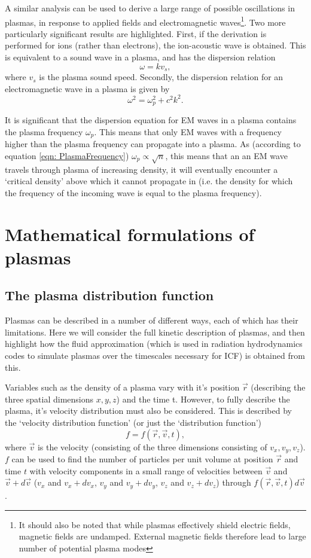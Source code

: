 A similar analysis can be used to derive a large range of possible oscillations in plasmas, in response to applied fields and electromagnetic waves\footnote{It should also be noted that while plasmas effectively shield electric fields, magnetic fields are undamped. External magnetic fields therefore lead to large number of potential plasma modes}. Two more particularly significant results are highlighted. First, if the derivation is performed for ions (rather than electrons), the ion-acoustic wave is obtained. This is equivalent to a sound wave in a plasma, and has the dispersion relation
\begin{equation} \omega = k v_s, \end{equation} where $v_s$ is the plasma sound speed. Secondly, the dispersion relation for an electromagnetic wave in a plasma is given by 
\begin{equation} \omega^2 = \omega_p^2 + c^2k^2. \end{equation}

It is significant that the dispersion equation for EM waves in a plasma contains the plasma frequency $\omega_p$. This means that only EM waves with a frequency higher than the plasma frequency can propagate into a plasma. As (according to equation \ref{eqn: PlasmaFrequency}) $\omega_p \propto \sqrt{n}$, this means that an an EM wave travels through plasma of increasing density, it will eventually encounter a `critical density' above which it cannot propagate in (i.e. the density for which the frequency of the incoming wave is equal to the plasma frequency). 

\section{Mathematical formulations of plasmas}

\subsection{The plasma distribution function}
Plasmas can be described in a number of different ways, each of which has their limitations. Here we will consider the full kinetic description of plasmas, and then highlight how the fluid approximation (which is used in radiation hydrodynamics codes to simulate plasmas over the timescales necessary for ICF) is obtained from this.

Variables such as the density of a plasma vary with it's position $\vec{r}$ (describing the three spatial dimensions $x,y,z$) and the time t. However, to fully describe the plasma, it's velocity distribution must also be considered. This is described by the `velocity distribution function' (or just the `distribution function') 
\begin{equation} f = f(\vec{r}, \vec{v}, t), \end{equation} 
where $\vec{v}$ is the velocity (consisting of the three dimensions consisting of $v_x, v_y, v_z$). $f$ can be used to find the number of particles per unit volume at position $\vec{r}$ and time $t$ with velocity components in a small range of velocities between $\vec{v}$ and $\vec{v} + d\vec{v}$ ($v_x$ and $v_x + dv_x$, $v_y$ and $v_y + dv_y$, $v_z$ and $v_z + dv_z$) through $f(\vec{r}, \vec{v}, t) d\vec{v}$.

